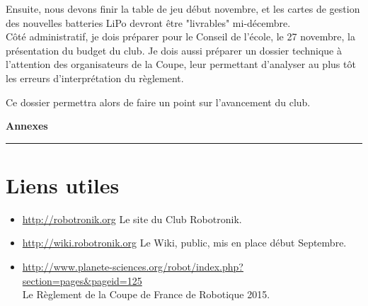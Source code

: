 \documentclass[a4paper,11pt]{article} \usepackage[T1]{fontenc} \usepackage[utf8]{inputenc} \usepackage[francais]{babel}
\begin{document}
Ensuite, nous devons finir la table de jeu début novembre, et les cartes de gestion des nouvelles batteries LiPo devront être "livrables" mi-décembre.\\

Côté administratif, je dois préparer pour le Conseil de l'école, le 27 novembre, la présentation du budget du club. Je dois aussi préparer un dossier technique à l'attention des organisateurs de la Coupe, leur permettant d'analyser au plus tôt les erreurs d'interprétation du règlement.

Ce dossier permettra alors de faire un point sur l'avancement du club.

\newpage
\begin{center}
\setcounter{page}{0}
\vspace*{10cm}
{\huge\bfseries Annexes\\
[0.4cm]}\rule{\linewidth}{0.5mm}
\end{center}

\newpage


\section{Liens utiles}
\begin{itemize}
    \item \url{http://robotronik.org} Le site du Club Robotronik.
    \item \url{http://wiki.robotronik.org} Le Wiki, public, mis en place début Septembre.
    \item \url{http://www.planete-sciences.org/robot/index.php?section=pages&pageid=125}\\ Le Règlement de la Coupe de France de Robotique 2015.
\end{itemize}
\end{document}
